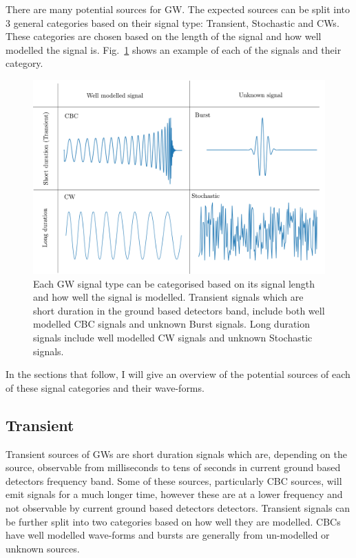 There are many potential sources for \gls{GW}. The expected sources can be split into 3 general categories based on their signal type: Transient, Stochastic and \glspl{CW}.
These categories are chosen based on the length of the signal and how well modelled the signal is.
Fig.~\ref{intro:sources:signaltypes} shows an example of each of the signals and their category.
%
\begin{figure}[h]
    \centering
    \includegraphics[width=\textwidth]{C1_intro/sources_types.pdf}
    \caption[GW signal types]{Each \gls{GW} signal type can be categorised based on its signal length and how well the signal is modelled. Transient signals which are short duration in the ground based detectors band, include both well modelled \gls{CBC} signals and unknown Burst signals. Long duration signals include well modelled \gls{CW} signals and unknown Stochastic signals.}
    \label{intro:sources:signaltypes}
\end{figure}
In the sections that follow, I will give an overview of the potential sources of each of these signal categories and their wave-forms.


\subsection{\label{sources:transient} Transient}

Transient sources of \glspl{GW} are short duration signals which are, depending on the source, observable from milliseconds to tens of seconds in current ground based detectors frequency band. 
Some of these sources, particularly \gls{CBC} sources, will emit signals for a much longer time, however these are at a lower frequency and not observable by current ground based detectors detectors.
Transient signals can be further split into two categories based on how well they are modelled. 
\glspl{CBC} have well modelled wave-forms and bursts are generally from un-modelled or unknown sources.

